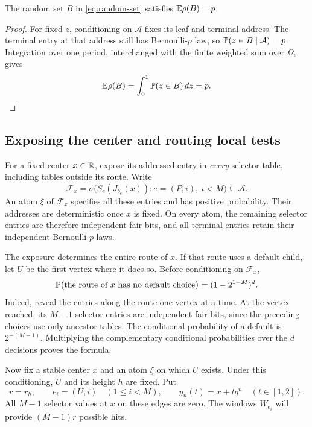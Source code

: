 \begin{lemma}
 \label{lem:density}
The random set \(B\) in \eqref{eq:random-set} satisfies
\(\mathbb E\rho(B)=p\).
\end{lemma}

\begin{proof}
For fixed \(z\), conditioning on \(\mathcal A\) fixes
its leaf and terminal address. The terminal entry at that address still
has Bernoulli-\(p\) law, so \(\mathbb P(z\in B\mid\mathcal A)=p\).
Integration over one period, interchanged with the finite weighted sum
over \(\Omega\), gives
\[
 \mathbb E\rho(B)=\int_0^1\mathbb P(z\in B)\,dz=p.
\]
\end{proof}

\subsection{Exposing the center and routing local tests}

For a fixed center \(x\in\mathbb R\), expose its addressed entry in
\emph{every} selector table, including tables outside its route. Write
\begin{equation}
 \label{eq:center-exposure}
 \mathcal F_x=
 \sigma\bigl(S_e(J_{b_e}(x)):e=(P,i),\ i<M\bigr)
 \subseteq\mathcal A.
\end{equation}
An atom \(\xi\) of \(\mathcal F_x\) specifies all these entries and
has positive probability. Their addresses are deterministic once \(x\)
is fixed. On every atom, the remaining selector entries are therefore
independent fair bits, and all terminal entries retain their independent
Bernoulli-\(p\) laws.

The exposure determines the entire route of \(x\). If that route uses
a default child, let \(U\) be the first vertex where it does so.
Before conditioning on \(\mathcal F_x\),
\begin{equation}
 \label{eq:no-default}
 \mathbb P\bigl(\text{the route of \(x\) has no default choice}\bigr)
 =(1-2^{1-M})^d.
\end{equation}
Indeed, reveal the entries along the route one vertex at a time. At the
vertex reached, its \(M-1\) selector entries are independent fair bits,
since the preceding choices use only ancestor tables. The conditional
probability of a default is \(2^{-(M-1)}\). Multiplying the complementary
conditional probabilities over the \(d\) decisions proves the formula.

Now fix a stable center \(x\) and an atom \(\xi\) on which \(U\)
exists. Under this conditioning, \(U\) and its height \(h\) are fixed.
Put
\[
 r=r_h,\qquad e_i=(U,i)\quad(1\le i<M),\qquad
 y_n(t)=x+tq^n\quad(t\in[1,2]).
\]
All \(M-1\) selector values at \(x\) on these edges are zero. The
windows \(W_{e_i}\) will provide \((M-1)r\) possible hits.

